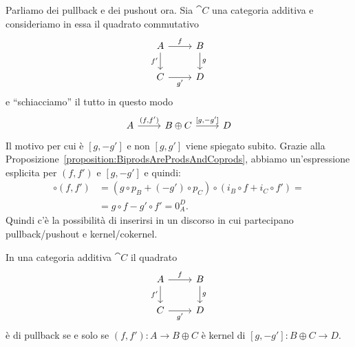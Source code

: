 Parliamo dei pullback e dei pushout ora. Sia \(\cat C\) una categoria
additiva e consideriamo in essa il quadrato commutativo
\[
  \begin{tikzcd}
    A \ar["{f}", r] \ar["{f'}", d, swap] & B \ar["{g}", d] \\
    C \ar["{g'}", r, swap] & D
  \end{tikzcd}
\]
e ``schiacciamo'' il tutto in questo modo
\[
  \begin{tikzcd}
    A \ar["{(f, f')}", r] & B \oplus C \ar["{[g, -g']}", r] & D
  \end{tikzcd}
\]
Il motivo per cui è \([g, -g']\) e non \([g, g']\) viene spiegato
subito. Grazie alla
Proposizione~\ref{proposition:BiprodsAreProdsAndCoprods}, abbiamo
un'espressione esplicita per \((f,f')\) e \([g,-g']\) e quindi:
\begin{align*} [g, -g'] \circ (f, f') &= (g \circ p_B + (-g') \circ p_C)
  \circ (i_B
                                        \circ f + i_C \circ f') = \\
                                      &= g \circ f - g' \circ f' = 0_A^D
                                        .
\end{align*}
Quindi c'è la possibilità di inserirsi in un discorso in cui partecipano
pullback/pushout e kernel/cokernel.

\begin{proposition}\label{proposition:FromPullbackToKernel}
  In una categoria additiva \(\cat C\) il quadrato
  \[
    \begin{tikzcd}
      A \ar["{f}", r] \ar["{f'}", d, swap] & B \ar["{g}", d] \\
      C \ar["{g'}", r, swap] & D
    \end{tikzcd}
  \]
  è di pullback se e solo se \((f, f') : A \to B \oplus C\) è kernel di
  \([g, -g'] : B \oplus C \to D\).
\end{proposition}

